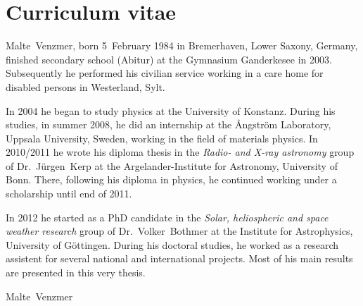 
\chapter*{Curriculum vitae}


Malte~Venzmer, born 5~February 1984 in Bremerhaven, Lower Saxony, Germany, finished secondary school (Abitur) at the Gymnasium Ganderkesee in 2003. Subsequently he performed his civilian service working in a care home for disabled persons in Westerland, Sylt.

In 2004 he began to study physics at the University of Konstanz. During his studies, in summer 2008, he did an internship at the \AA{}ngström Laboratory, Uppsala University, Sweden, working in the field of materials physics. In 2010/2011 he wrote his diploma thesis in the \textit{Radio- and X-ray astronomy} group of Dr.~Jürgen~Kerp at the Argelander-Institute for Astronomy, University of Bonn. There, following his diploma in physics, he continued working under a scholarship until end of 2011.

In 2012 he started as a PhD candidate in the \textit{Solar, heliospheric and space weather research} group of Dr.~Volker~Bothmer at the Institute for Astrophysics, University of Göttingen. During his doctoral studies, he worked as a research assistent for several national and international projects. Most of his main results are presented in this very thesis.



\vspace{3\baselineskip}

\begin{large}
	Malte~Venzmer
\end{large}

\vspace{\baselineskip}

